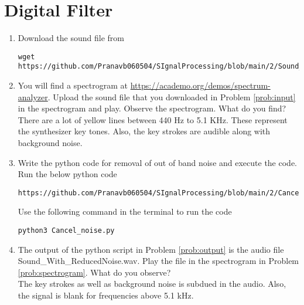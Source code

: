 \documentclass[journal,12pt,twocolumn]{IEEEtran}
\renewcommand\thesection{\arabic{section}}
\begin{document}
\section{Digital Filter}
\begin{enumerate}[label=\thesection.\arabic*
,ref=\thesection.\theenumi]
\item
\label{prob:input}
Download the sound file from  
\begin{lstlisting}
wget https://github.com/Pranavb060504/SIgnalProcessing/blob/main/2/Sound_Noise.wav
\end{lstlisting}
\item
\label{prob:spectrogram}
You will find a spectrogram at \href{https://academo.org/demos/spectrum-analyzer}{\url{https://academo.org/demos/spectrum-analyzer}}. 
%
Upload the sound file that you downloaded in Problem \ref{prob:input} in the spectrogram  and play.  Observe the spectrogram. What do you find?
\\
%
\solution There are a lot of yellow lines between 440 Hz to 5.1 KHz.  These represent the synthesizer key tones. Also, the key strokes
are audible along with background noise.
\item
\label{prob:output}
Write the python code for removal of out of band noise and execute the code.
\\
\solution
Run the below python code 
\begin{lstlisting}
https://github.com/Pranavb060504/SIgnalProcessing/blob/main/2/Cancel_noise.py
\end{lstlisting}
Use the following command in the terminal to run the code
\begin{lstlisting}
python3 Cancel_noise.py
\end{lstlisting}
%
\item
The output of the python script in Problem \ref{prob:output} is the audio file Sound\_With\_ReducedNoise.wav. Play the file in the spectrogram in Problem \ref{prob:spectrogram}. What do you observe?
\\
\solution The key strokes as well as background noise is subdued in the audio.  Also,  the signal is blank for frequencies above 5.1 kHz.

\end{enumerate}
\end{document}
